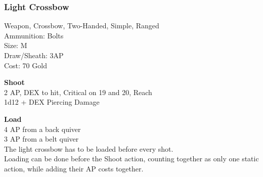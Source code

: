 \subsubsection{Light Crossbow}\label{weapon:lightCrossbow}
Weapon, Crossbow, Two-Handed, Simple, Ranged\\
Ammunition: Bolts\\
Size: M\\
Draw/Sheath: 3AP\\
Cost: 70 Gold

\textbf{Shoot} \\
2 AP, DEX to hit, Critical on 19 and 20,  Reach\\
1d12 + \texttimes DEX Piercing Damage

\textbf{Load} \\
4 AP from a back quiver\\
3 AP from a belt quiver\\
The light crossbow has to be loaded before every shot.\\
Loading can be done before the Shoot action, counting together as only one static action, while adding their AP costs together.\\